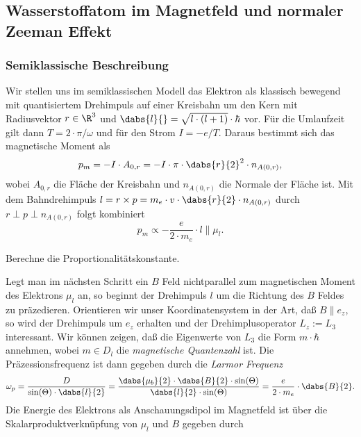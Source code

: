\documentclass{subfile}
\begin{document}
    
        \subsection{Wasserstoffatom im Magnetfeld und normaler Zeeman Effekt}
            \subsubsection*{Semiklassische Beschreibung}
                Wir stellen uns im semiklassischen Modell das Elektron als klassisch bewegend mit quantisiertem Drehimpuls auf einer Kreisbahn um den Kern mit Radiusvektor $r\in\R^3$ und $\dabs{l}{} = \sqrt{l\cdot (l+1)}\cdot\hbar$ vor. Für die Umlaufzeit gilt dann $T = 2\cdot\pi/\omega$ und für den Strom $I = -e/T$. Daraus bestimmt sich das magnetische Moment als
                \[
                    p_m = -I \cdot A_{0,r} = -I\cdot \pi\cdot \dabs{r}{2}^2\cdot n_{A(0,r)},
                \]
                wobei $A_{0,r}$ die Fläche der Kreisbahn und $n_{A(0,r)}$ die Normale der Fläche ist. Mit dem Bahndrehimpuls $l = r\times p = m_e\cdot v\cdot \dabs{r}{2}\cdot n_{A(0,r)}$ durch $r\perp p\perp n_{A(0,r)}$ folgt kombiniert
                \[
                    p_m \propto -\frac{e}{2\cdot m_e}\cdot l \parallel \mu_l.
                \]
                \begin{Aufgabe}
                    \nr{} Berechne die Proportionalitätskonstante.
                \end{Aufgabe}
                Legt man im nächsten Schritt ein $B$ Feld nichtparallel zum magnetischen Moment des Elektrons $\mu_l$ an, so beginnt der Drehimpuls $l$ um die Richtung des $B$ Feldes zu präzedieren. Orientieren wir unser Koordinatensystem in der Art, daß $B \parallel e_z$, so wird der Drehimpuls um $e_z$ erhalten und der Drehimplusoperator $L_z := L_3$ interessant. Wir können zeigen, daß die Eigenwerte von $L_3$ die Form $m\cdot\hbar$ annehmen, wobei $m\in D_l$ die \emph{magnetische Quantenzahl} ist. Die Präzessionsfrequenz ist dann gegeben durch die \emph{Larmor Frequenz} 
                \[
                    \omega_p = \frac{D}{\sin(\Theta)\cdot\dabs{l}{2}} = \frac{\dabs{\mu_b}{2}\cdot\dabs{B}{2}\cdot\sin(\Theta)}{\dabs{l}{2}\cdot \sin(\Theta)} = \frac{e}{2\cdot m_e}\cdot\dabs{B}{2}.
                \]
                Die Energie des Elektrons als Anschauungsdipol im Magnetfeld ist über die Skalarproduktverknüpfung von $\mu_l$ und $B$ gegeben durch
\end{document}
